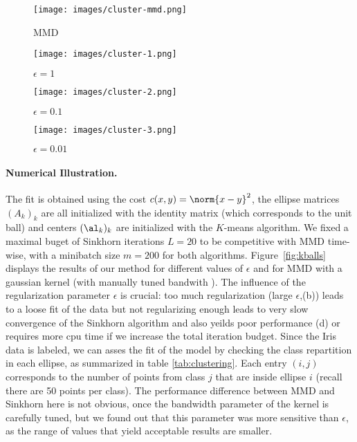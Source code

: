   \begin{figure*}[ht]
  \centering
  \begin{subfigure}{0.25\textwidth}
  \texttt{[image: images/cluster-mmd.png]} 
  \caption{MMD}
  \end{subfigure}%
  \begin{subfigure}{0.25\textwidth}
  \texttt{[image: images/cluster-1.png]} 
  \caption{$\epsilon = 1$ }
  \end{subfigure}%
  \begin{subfigure}{0.25\textwidth}
  \texttt{[image: images/cluster-2.png]} 
  \caption{$\epsilon = 0.1$}
  \end{subfigure}%
  \begin{subfigure}{0.25\textwidth}
  \texttt{[image: images/cluster-3.png]} 
  \caption{$\epsilon = 0.01$}
  \end{subfigure}%
  \caption{Ellipses after convergence of the stochastic gradient descent with $L=20$, $m=200$
  \label{fig:kballs}}
  \end{figure*}
\paragraph{Numerical Illustration.} The fit is obtained using the cost $c(x,y)=\norm{x-y}^2$, the ellipse matrices $(A_k)_k$ are all initialized with the identity matrix (which corresponds to the unit ball) and centers $(\al_k)_k$ are initialized with the $K$-means algorithm. We fixed a maximal buget of Sinkhorn iterations $L = 20$ to be competitive with MMD time-wise, with a minibatch size $m=200$ for both algorithms. Figure~\ref{fig:kballs} displays the results of our method for different values of $\epsilon$ and for MMD with a gaussian kernel (with manually tuned bandwith ). The influence of the regularization parameter $\epsilon$ is crucial: too much regularization (large $\epsilon$,(b)) leads to a loose fit of the data but not regularizing enough leads to very slow convergence of the Sinkhorn algorithm and also yeilds poor performance (d) or requires more cpu time if we increase the total iteration budget. 
%
Since the Iris data is labeled, we can asses the fit of the model by checking the class repartition in each ellipse, as summarized in table \ref{tab:clustering}. Each entry $(i,j)$ corresponds to the number of points from class $j$ that are inside ellipse $i$ (recall there are 50 points per class). The performance difference between MMD and Sinkhorn here is not obvious, once the bandwidth parameter of the kernel is carefully tuned, but we found out that this parameter was more sensitive than $\epsilon$, as the range of values that yield acceptable results are smaller.



